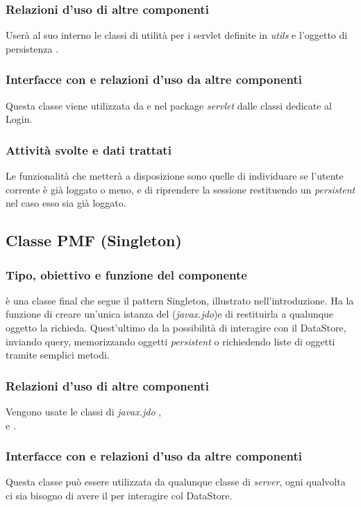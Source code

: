 \subsubsection*{Relazioni d'uso di altre componenti}
User\`a al suo interno le classi di utilit\`a per i servlet definite in
\emph{utils} e l'oggetto di persistenza .

\subsubsection*{Interfacce con e relazioni d'uso da altre componenti}
Questa classe viene utilizzata da  e nel package
\emph{servlet} dalle classi dedicate al Login.

\subsubsection*{Attivit\`a svolte e dati trattati}
Le funzionalit\`a che metter\`a a disposizione sono quelle di individuare se
l'utente corrente \`e gi\`a loggato o meno, e di riprendere la
sessione restituendo un \emph{persistent}  nel caso esso sia
gi\`a loggato.

\subsection{Classe PMF (Singleton)}
\subsubsection*{Tipo, obiettivo e funzione del componente}
 \`e una classe final che segue il pattern Singleton, illustrato
nell'introduzione. Ha la funzione di creare un'unica istanza del
 (\emph{javax.jdo})e di restituirla a qualunque
oggetto la richieda. Quest'ultimo da la possibilit\`a di interagire con il DataStore, inviando
query, memorizzando oggetti \emph{persistent} o richiedendo liste di oggetti
tramite semplici metodi.

\subsubsection*{Relazioni d'uso di altre componenti}
Vengono usate le classi di \emph{javax.jdo} ,
\\ e .

\subsubsection*{Interfacce con e relazioni d'uso da altre componenti}
Questa classe pu\`o essere utilizzata da qualunque classe di \emph{server}, ogni
qualvolta ci sia bisogno di avere il  per interagire col
DataStore.

